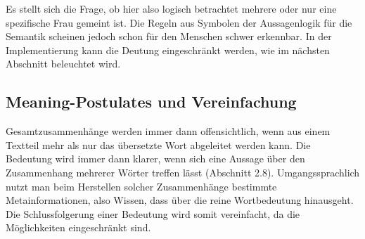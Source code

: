 \documentclass[12pt]{report}
\begin{document}
Es stellt sich die Frage, ob hier also logisch betrachtet mehrere oder nur eine spezifische Frau gemeint ist. Die Regeln aus Symbolen der Aussagenlogik für die Semantik scheinen jedoch schon für den Menschen schwer erkennbar. In der Implementierung kann die Deutung eingeschränkt werden, wie im nächsten Abschnitt beleuchtet wird.

\subsection{Meaning-Postulates und Vereinfachung}
Gesamtzusammenhänge werden immer dann offensichtlich, wenn aus einem Textteil mehr als nur das übersetzte Wort abgeleitet werden kann. Die Bedeutung wird immer dann klarer, wenn sich eine Aussage über den Zusammenhang mehrerer Wörter treffen lässt (Abschnitt 2.8). Umgangssprachlich nutzt man beim Herstellen solcher Zusammenhänge bestimmte Metainformationen, also Wissen, dass über die reine Wortbedeutung hinausgeht. Die Schlussfolgerung einer Bedeutung wird somit vereinfacht, da die Möglichkeiten eingeschränkt sind. 
\end{document}
